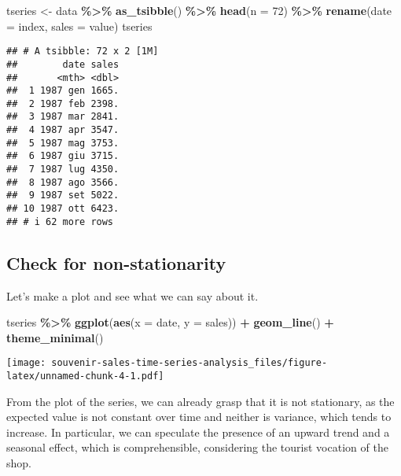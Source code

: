 \documentclass[
]{article}
\newenvironment{Shaded}{\begin{snugshade}}{\end{snugshade}}
\newcommand{\AttributeTok}[1]{\textcolor[rgb]{0.13,0.29,0.53}{#1}}
\newcommand{\DecValTok}[1]{\textcolor[rgb]{0.00,0.00,0.81}{#1}}
\newcommand{\FunctionTok}[1]{\textcolor[rgb]{0.13,0.29,0.53}{\textbf{#1}}}
\newcommand{\NormalTok}[1]{#1}
\newcommand{\OtherTok}[1]{\textcolor[rgb]{0.56,0.35,0.01}{#1}}
\newcommand{\SpecialCharTok}[1]{\textcolor[rgb]{0.81,0.36,0.00}{\textbf{#1}}}
\begin{document}
\begin{Shaded}
\begin{Highlighting}[]
\NormalTok{tseries }\OtherTok{\textless{}{-}}\NormalTok{ data }\SpecialCharTok{\%\textgreater{}\%} \FunctionTok{as\_tsibble}\NormalTok{() }\SpecialCharTok{\%\textgreater{}\%} \FunctionTok{head}\NormalTok{(}\AttributeTok{n =} \DecValTok{72}\NormalTok{) }\SpecialCharTok{\%\textgreater{}\%}
  \FunctionTok{rename}\NormalTok{(}\AttributeTok{date =}\NormalTok{ index, }\AttributeTok{sales =}\NormalTok{ value)}
\NormalTok{tseries}
\end{Highlighting}
\end{Shaded}

\begin{verbatim}
## # A tsibble: 72 x 2 [1M]
##        date sales
##       <mth> <dbl>
##  1 1987 gen 1665.
##  2 1987 feb 2398.
##  3 1987 mar 2841.
##  4 1987 apr 3547.
##  5 1987 mag 3753.
##  6 1987 giu 3715.
##  7 1987 lug 4350.
##  8 1987 ago 3566.
##  9 1987 set 5022.
## 10 1987 ott 6423.
## # i 62 more rows
\end{verbatim}

\hypertarget{check-for-non-stationarity}{%
\subsection{Check for
non-stationarity}\label{check-for-non-stationarity}}

Let's make a plot and see what we can say about it.

\begin{Shaded}
\begin{Highlighting}[]
\NormalTok{tseries }\SpecialCharTok{\%\textgreater{}\%} \FunctionTok{ggplot}\NormalTok{(}\FunctionTok{aes}\NormalTok{(}\AttributeTok{x =}\NormalTok{ date, }\AttributeTok{y =}\NormalTok{ sales)) }\SpecialCharTok{+}
  \FunctionTok{geom\_line}\NormalTok{() }\SpecialCharTok{+}
  \FunctionTok{theme\_minimal}\NormalTok{()}
\end{Highlighting}
\end{Shaded}

\texttt{[image: souvenir-sales-time-series-analysis\_files/figure-latex/unnamed-chunk-4-1.pdf]}

From the plot of the series, we can already grasp that it is not
stationary, as the expected value is not constant over time and neither
is variance, which tends to increase. In particular, we can speculate
the presence of an upward trend and a seasonal effect, which is
comprehensible, considering the tourist vocation of the shop.
\end{document}
